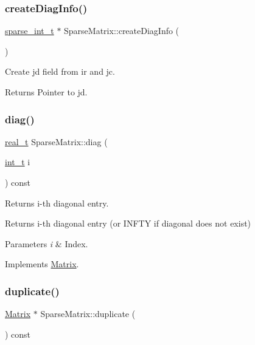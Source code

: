 \subsubsection{\texorpdfstring{create\+Diag\+Info()}{createDiagInfo()}}
{\footnotesize\ttfamily \hyperlink{_types_8hpp_aa5432b00c9081e2d62d7f38c32e4ed80}{sparse\+\_\+int\+\_\+t} $\ast$ Sparse\+Matrix\+::create\+Diag\+Info (\begin{DoxyParamCaption}{ }\end{DoxyParamCaption})}

Create jd field from ir and jc. \begin{DoxyReturn}{Returns}
Pointer to jd. 
\end{DoxyReturn}
\mbox{\label{class_sparse_matrix_a0a85fc812509525708eae5d94fd5dcb8}} 
\subsubsection{\texorpdfstring{diag()}{diag()}}
{\footnotesize\ttfamily \hyperlink{qp_o_a_s_e_s__wrapper_8h_a0d00e2b3dfadee81331bbb39068570c4}{real\+\_\+t} Sparse\+Matrix\+::diag (\begin{DoxyParamCaption}\item[{\hyperlink{_types_8hpp_ab6fd6105e64ed14a0c9281326f05e623}{int\+\_\+t}}]{i }\end{DoxyParamCaption}) const\hspace{0.3cm}{\ttfamily [virtual]}}

Returns i-\/th diagonal entry. \begin{DoxyReturn}{Returns}
i-\/th diagonal entry (or I\+N\+F\+TY if diagonal does not exist) 
\end{DoxyReturn}

\begin{DoxyParams}{Parameters}
{\em i} & Index. \\
\hline
\end{DoxyParams}


Implements \hyperlink{class_matrix_a8d76d428884fdb7a3deade8cad3c4b0a}{Matrix}.

\mbox{\label{class_sparse_matrix_a6bc56359292e4a3e97ecbca4c8f3d3c6}} 
\subsubsection{\texorpdfstring{duplicate()}{duplicate()}}
{\footnotesize\ttfamily \hyperlink{class_matrix}{Matrix} $\ast$ Sparse\+Matrix\+::duplicate (\begin{DoxyParamCaption}{ }\end{DoxyParamCaption}) const\hspace{0.3cm}{\ttfamily [virtual]}}

